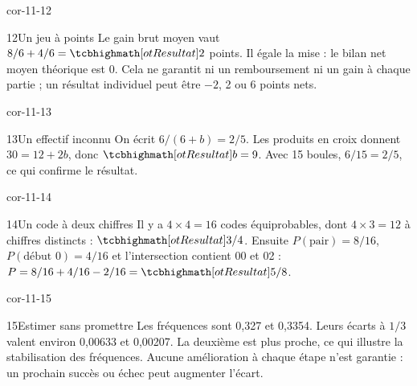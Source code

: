 \begin{blocLivre}{cor-11-12}\begin{corrige}{12}{Un jeu à points}
Le gain brut moyen vaut $8/6+4/6=\res2$ points. Il égale la mise : le bilan net moyen théorique est 0. Cela ne garantit ni un remboursement ni un gain à chaque partie ; un résultat individuel peut être $-2$, 2 ou 6 points nets.
\end{corrige}\end{blocLivre}
\begin{blocLivre}{cor-11-13}\begin{corrige}{13}{Un effectif inconnu}
On écrit $6/(6+b)=2/5$. Les produits en croix donnent $30=12+2b$, donc $\res{b=9}$. Avec 15 boules, $6/15=2/5$, ce qui confirme le résultat.
\end{corrige}\end{blocLivre}
\begin{blocLivre}{cor-11-14}\begin{corrige}{14}{Un code à deux chiffres}
Il y a $4\times4=16$ codes équiprobables, dont $4\times3=12$ à chiffres distincts : $\res{3/4}$. Ensuite $P(\text{pair})=8/16$, $P(\text{début }0)=4/16$ et l’intersection contient 00 et 02 : $P=8/16+4/16-2/16=\res{5/8}$.
\end{corrige}\end{blocLivre}
\begin{blocLivre}{cor-11-15}\begin{corrige}{15}{Estimer sans promettre}
Les fréquences sont 0,327 et 0,3354. Leurs écarts à $1/3$ valent environ 0,00633 et 0,00207. La deuxième est plus proche, ce qui illustre la stabilisation des fréquences. Aucune amélioration à chaque étape n’est garantie : un prochain succès ou échec peut augmenter l’écart.
\end{corrige}\end{blocLivre}
